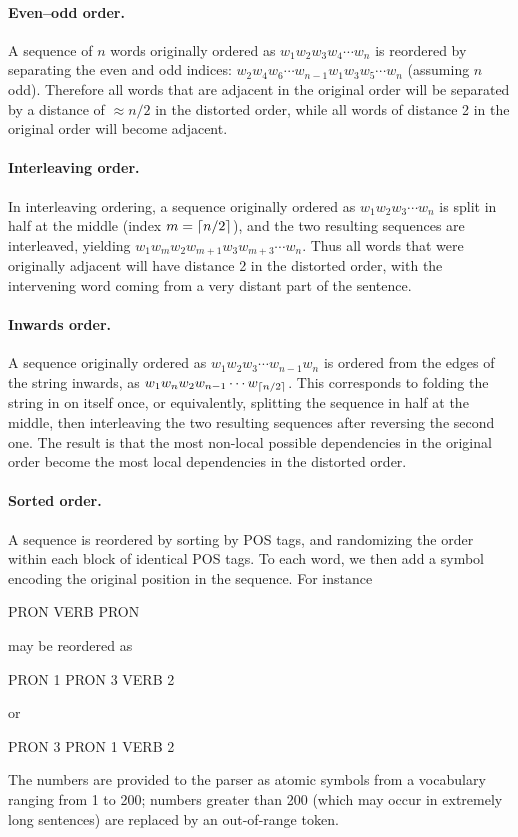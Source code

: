 \documentclass[10pt,twoside,lineno]{article}
\DeclarePairedDelimiter{\ceiling}{\lceil}{\rceil}
\begin{document}
\paragraph{Even--odd order.} A sequence of $n$ words originally ordered as $w_1 w_2 w_3 w_4 \cdots w_n$ is reordered by separating the even and odd indices: $w_2 w_4 w_6 \cdots w_{n-1} w_1 w_3 w_5 \cdots w_n$ (assuming $n$ odd). Therefore all words that are adjacent in the original order will be separated by a distance of $\approx n/2$ in the distorted order, while all words of distance 2 in the original order will become adjacent.

\paragraph{Interleaving order.} In interleaving ordering, a sequence originally ordered as $w_1 w_2 w_3 \cdots w_n$ is split in half at the middle (index $m=\ceiling{n/2}$), and the two resulting sequences are interleaved, yielding $w_1 w_m w_2 w_{m+1} w_3 w_{m+3} \cdots w_n$. Thus all words that were originally adjacent will have distance 2 in the distorted order, with the intervening word coming from a very distant part of the sentence.

\paragraph{Inwards order.} A sequence originally ordered as $w_1 w_2 w_3 \cdots w_{n-1} w_n$ is ordered from the edges of the string inwards, as $w_1 w_n w_2 w_{n-1} \cdots w_{\ceiling{n/2}}$. This corresponds to folding the string in on itself once, or equivalently, splitting the sequence in half at the middle, then interleaving the two resulting sequences after reversing the second one. The result is that the most non-local possible dependencies in the original order become the most local dependencies in the distorted order.

\paragraph{Sorted order.} A sequence is reordered by sorting by POS tags, and randomizing the order within each block of identical POS tags.
To each word, we then add a symbol encoding the original position in the sequence.
For instance
\begin{center}
PRON VERB PRON
\end{center}
may be reordered as
\begin{center}
PRON 1 PRON 3 VERB 2
\end{center}
or
\begin{center}
PRON 3 PRON 1 VERB 2
\end{center}
The numbers are provided to the parser as atomic symbols from a vocabulary ranging from 1 to 200; numbers greater than 200 (which may occur in extremely long sentences) are replaced by an out-of-range token.
\end{document}
